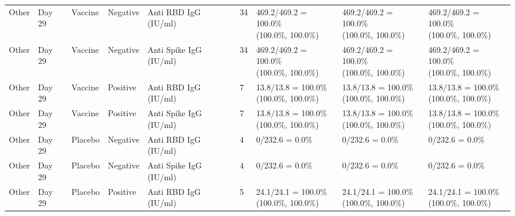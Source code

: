 \documentclass[]{book}
\theoremstyle{definition}
\theoremstyle{definition}
\theoremstyle{definition}
\newcommand{\1}{\mathbbm{1}}
\begin{document}
\begin{landscape}
\begin{ThreePartTable}
\begin{longtable}[t]{>{\raggedright\arraybackslash}p{2.7cm}llllllll}
\hspace{1em}Other & Day 29 & Vaccine & Negative & Anti RBD IgG (IU/ml) & 34 & \makecell[l]{469.2/469.2 = 100.0\%\\(100.0\%, 100.0\%)} & \makecell[l]{469.2/469.2 = 100.0\%\\(100.0\%, 100.0\%)} & \makecell[l]{469.2/469.2 = 100.0\%\\(100.0\%, 100.0\%)}\\
\hspace{1em}Other & Day 29 & Vaccine & Negative & Anti Spike IgG (IU/ml) & 34 & \makecell[l]{469.2/469.2 = 100.0\%\\(100.0\%, 100.0\%)} & \makecell[l]{469.2/469.2 = 100.0\%\\(100.0\%, 100.0\%)} & \makecell[l]{469.2/469.2 = 100.0\%\\(100.0\%, 100.0\%)}\\
\hspace{1em}Other & Day 29 & Vaccine & Positive & Anti RBD IgG (IU/ml) & 7 & \makecell[l]{13.8/13.8 = 100.0\%\\(100.0\%, 100.0\%)} & \makecell[l]{13.8/13.8 = 100.0\%\\(100.0\%, 100.0\%)} & \makecell[l]{13.8/13.8 = 100.0\%\\(100.0\%, 100.0\%)}\\
\hspace{1em}Other & Day 29 & Vaccine & Positive & Anti Spike IgG (IU/ml) & 7 & \makecell[l]{13.8/13.8 = 100.0\%\\(100.0\%, 100.0\%)} & \makecell[l]{13.8/13.8 = 100.0\%\\(100.0\%, 100.0\%)} & \makecell[l]{13.8/13.8 = 100.0\%\\(100.0\%, 100.0\%)}\\
\hspace{1em}Other & Day 29 & Placebo & Negative & Anti RBD IgG (IU/ml) & 4 & 0/232.6 = 0.0\% & 0/232.6 = 0.0\% & 0/232.6 = 0.0\%\\
\hspace{1em}Other & Day 29 & Placebo & Negative & Anti Spike IgG (IU/ml) & 4 & 0/232.6 = 0.0\% & 0/232.6 = 0.0\% & 0/232.6 = 0.0\%\\
\hspace{1em}Other & Day 29 & Placebo & Positive & Anti RBD IgG (IU/ml) & 5 & \makecell[l]{24.1/24.1 = 100.0\%\\(100.0\%, 100.0\%)} & \makecell[l]{24.1/24.1 = 100.0\%\\(100.0\%, 100.0\%)} & \makecell[l]{24.1/24.1 = 100.0\%\\(100.0\%, 100.0\%)}\\

\end{longtable}
\end{ThreePartTable}
\end{landscape}
\end{document}
